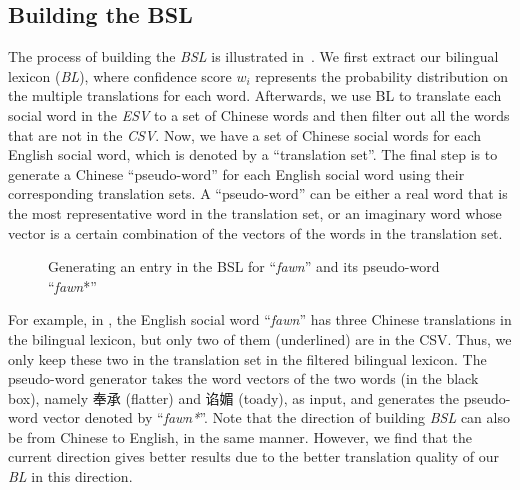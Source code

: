 \subsection{Building the {BSL}}
\label{sec:bsl}
The process of building the \textit{BSL} is 
illustrated in~. 
We first extract our bilingual lexicon (\textit{BL}), where confidence score 
$w_i$ represents the probability distribution on the multiple translations 
for each word. 
Afterwards, we use BL to translate each social word 
in the \textit{ESV} to a set of Chinese words and then filter out all the words that are not in the \textit{CSV}. 
Now, we have a set of Chinese social words for each English social word, which is denoted by a ``translation set''. 
The final step is to generate a Chinese ``pseudo-word'' for each 
English social word using their corresponding translation sets.
{A ``pseudo-word'' can be either a real word that is the most 
representative word in the translation set, or an imaginary word whose 
vector is a certain combination of the vectors of the words in the 
translation set.}

\begin{figure*}[th]
	\centering
	\caption{Generating an entry in the BSL for ``\textit{fawn}'' 
		and its pseudo-word ``\textit{fawn}*''}
	\label{fig:BSL}
\end{figure*}

For example, in , the
English social word ``\textit{fawn}'' has three Chinese translations in the 
bilingual lexicon, but only two of them (underlined) are in the CSV. 
Thus, we only keep these two in the translation set in the filtered bilingual lexicon.
The pseudo-word generator takes the word vectors of the two words (in the black box), namely
奉承 (flatter) and 谄媚 (toady), as input, and generates the pseudo-word 
vector denoted by ``\textit{fawn*}''. {Note that the direction of building \textit{BSL} can also be from Chinese to English, 
	in the same manner. 
	However, we find that the current direction 
		gives better results due to the better translation quality of our \textit{BL} in this direction.}

